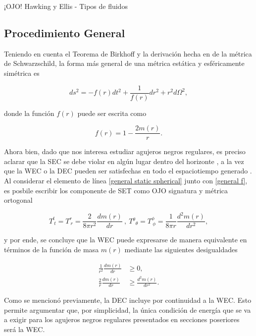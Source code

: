 \documentclass{article}
\numberwithin{equation}{section}
\begin{document}
¡OJO! Hawking y Ellis - Tipos de fluidos

\subsection{Procedimiento General}

Teniendo en cuenta el Teorema de Birkhoff \cite{gravitation} y la derivación hecha en \cite[Cap. 7]{carroll-lecture-notes} de la métrica de Schwarzschild, la forma más general de una métrica estática y esféricamente simétrica es

\begin{equation}
\label{general static spherical}
ds^2 = -f(r)dt^2 + \frac{1}{f(r)}dr^2 + r^2d\Omega^2,
\end{equation}

donde la función $f(r)$ puede ser escrita como

\begin{equation}
\label{general f}
f(r) = 1 - \frac{2m(r)}{r}.
\end{equation}

Ahora bien, dado que nos interesa estudiar agujeros negros regulares, es preciso aclarar que la SEC se debe violar en algún lugar dentro del horizonte \cite{zaslavskii}, a la vez que la WEC o la DEC pueden ser satisfechas en todo el espaciotiempo generado \cite{dymnikova2004}. Al considerar el elemento de línea \eqref{general static spherical} junto con \eqref{general f}, es posbile escribir los componente de SET como \cite{vanegas-weak} OJO signatura y métrica ortogonal

\begin{equation}
\label{wec set comp}
T^{t}_{\ t} = T^{r}_{\ r} = \frac{2}{8 \pi r^2} \frac{dm(r)}{dr}\ ,\ T{^\theta}_{\theta} = T^{\phi}_{\ \phi} = \frac{1}{8 \pi r} \frac{d^2m(r)}{dr^2},
\end{equation}

y por ende, se concluye que la WEC puede expresarse de manera equivalente en términos de la función de masa $m(r)$ mediante las siguientes desigualdades

\begin{align}
\label{mass wec ineq}
\frac{1}{r^2}\frac{dm(r)}{dr} &\geq 0,\\
\frac{2}{r}\frac{dm(r)}{dr} &\geq \frac{d^2m(r)}{dr^2}.
\end{align}

Como se mencionó previamente, la DEC incluye por continuidad a la WEC. Esto permite argumentar que, por simplicidad, la única condición de energía que se va a exigir para los agujeros negros regulares presentados en secciones poseriores será la WEC.
\end{document}

